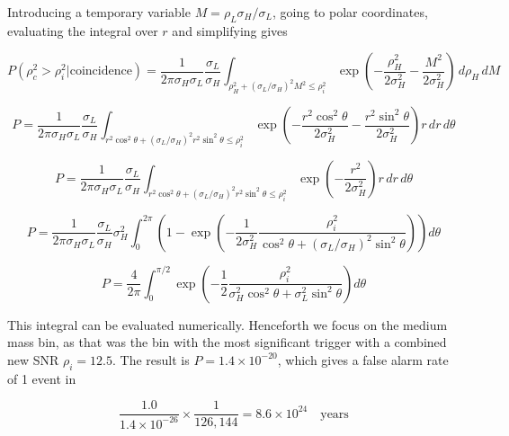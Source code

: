 Introducing a temporary variable $M = \rho_L \sigma_H/\sigma_L$, going to polar
coordinates, evaluating the integral over $r$ and simplifying gives


\begin{equation}
P(\rho_c^2 > \rho_i^2|\textrm{coincidence}) = 
\frac{1}{2\pi \sigma_H \sigma_L} 
\frac{\sigma_L}{\sigma_H}
\int_{\rho_H^2 + (\sigma_L/\sigma_H)^2 M^2 \leq \rho_i^2}
\exp\left(
-\frac{\rho_H^2}{2\sigma_H^2} -\frac{M^2}{2\sigma_H^2}
\right)
\,d\rho_H\,dM
\end{equation}



\begin{equation}
P = 
\frac{1}{2\pi \sigma_H \sigma_L} 
\frac{\sigma_L}{\sigma_H}
\int_{r^2\cos^2\theta + (\sigma_L/\sigma_H)^2 r^2\sin^2\theta \leq \rho_i^2}
\exp\left(
-\frac{r^2\cos^2\theta}{2\sigma_H^2} -\frac{r^2\sin^2\theta}{2\sigma_H^2}
\right)
r\, dr\, d\theta
\end{equation}


\begin{equation}
P = 
\frac{1}{2\pi \sigma_H \sigma_L} 
\frac{\sigma_L}{\sigma_H}
\int_{r^2\cos^2\theta + (\sigma_L/\sigma_H)^2 r^2\sin^2\theta \leq \rho_i^2}
\exp\left( -\frac{r^2}{2\sigma_H^2} \right)
r\, dr\, d\theta
\end{equation}


\begin{equation}
P = 
\frac{1}{2\pi \sigma_H \sigma_L} 
\frac{\sigma_L}{\sigma_H}
\sigma_H^2
\int_0^{2\pi}
\left( 1 - 
\exp\left(
  -\frac{1}{2\sigma_H^2} 
   \frac{\rho_i^2}
        {\cos^2\theta + (\sigma_L/\sigma_H)^2 \sin^2\theta} 
\right)
\right)
d\theta
\end{equation}

\begin{equation}
P = \frac{4}{2\pi}
\int_0^{\pi/2}
\exp\left(
  -\frac{1}{2} 
   \frac{\rho_i^2}
        {\sigma_H^2 \cos^2\theta + \sigma_L^2 \sin^2\theta} 
\right)
d\theta
\end{equation}

\fi

This integral can be evaluated numerically.  Henceforth we focus on
the medium mass bin, as that was the bin with the most significant
trigger with a combined new SNR $\rho_i = 12.5$.  The result is
$P = 1.4 \times 10^{-20}$, which gives a false alarm rate of
1 event in 

\begin{equation}
\frac{1.0}{1.4 \times 10^{-26}} \times \frac{1}{126,144}
= 8.6\times 10^{24}\quad\textrm{years}
\end{equation}

